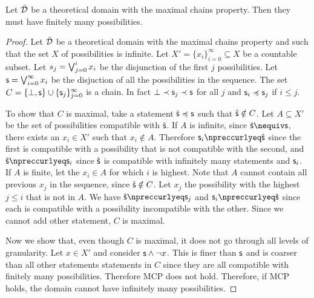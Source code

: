 \documentclass[10pt, onecolumn, longbibliography, nofootinbib]{revtex4-2}
\begin{document}
\begin{prop}
Let $\bar{\mathcal{D}}$ be a theoretical domain with the maximal chains property. Then they must have finitely many possibilities.
\end{prop}
\begin{proof}
Let $\bar{\mathcal{D}}$ be a theoretical domain with the maximal chains property and such that the set $X$ of possibilities is infinite. Let $X' = \{x_i\}_{i=0}^{\infty} \subseteq X$ be a countable subset. Let $s_j = \bigvee_{j=0}^{i} x_i$ be the disjunction of the first $j$ possibilities. Let $\mathsf{s} = \bigvee_{i=0}^{\infty} x_i$ be the disjuction of all the possibilities in the sequence. The set $C = \{ \bot, \mathsf{s} \} \cup \{\mathsf{s}_j\}_{j=0}^{\infty}$ is a chain. In fact $\bot \prec \mathsf{s}_j \prec \mathsf{s}$ for all $j$ and $\mathsf{s}_i \preccurlyeq \mathsf{s}_j$ if $i \leq j$.

To show that $C$ is maximal, take a statement $\hat{\mathsf{s}} \preccurlyeq \mathsf{s}$ such that $\hat{\mathsf{s}} \notin C$. Let $A \subseteq X'$ be the set of possibilities compatible with $\hat{\mathsf{s}}$. If $A$ is infinite, since $\hat{\stmt} \nequiv \stmt$, there exists an $x_i \in X'$ such that $x_i \notin A$. Therefore $\stmt_{i} \nnarrower \hat{\stmt}$ since the first is compatible with a possibility that is not compatible with the second, and $\hat{\stmt} \nnarrower \stmt_{i}$ since $\hat{\mathsf{s}}$ is compatible with infinitely many statements and $\mathsf{s}_{i}$. If $A$ is finite, let the $x_i \in A$ for which $i$ is highest. Note that $A$ cannot contain all previous $x_j$ in the sequence, since $\hat{\mathsf{s}} \notin C$. Let $x_j$ the possibility with the highest $j \leq i$ that is not in $A$. We have $\hat{\stmt} \nnarrower \stmt_{j}$ and $\stmt_{i} \nnarrower \hat{\stmt}$ since each is compatible with a possibility incompatible with the other. Since we cannot add other statement, $C$ is maximal.

Now we show that, even though $C$ is maximal, it does not go through all levels of granularity. Let $x \in X'$ and consider $\mathsf{s} \wedge \neg x$. This is finer than $\mathsf{s}$ and is coarser than all other statements statements in $C$ since they are all compatible with finitely many possibilities. Therefore MCP does not hold. Therefore, if MCP holds, the domain cannot have infinitely many possibilities.
\end{proof}


\end{document}

